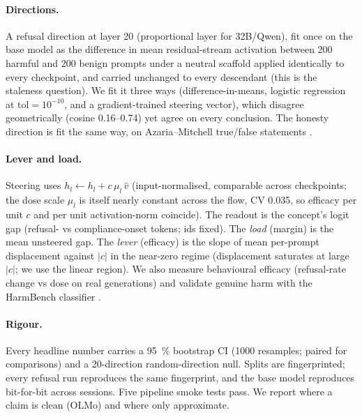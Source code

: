 \documentclass[11pt]{article}
\begin{document}
\paragraph{Directions.} A refusal direction at layer 20 (proportional layer for 32B/Qwen), fit once
on the base model as the difference in mean residual-stream activation between 200 harmful
\citep{advbench} and 200 benign \citep{alpaca} prompts under a neutral scaffold applied identically
to every checkpoint, and carried unchanged to every descendant (this is the staleness question). We
fit it three ways (difference-in-means, logistic regression at $\text{tol}=10^{-10}$, and a
gradient-trained steering vector), which disagree geometrically (cosine \num{0.16}--\num{0.74}) yet
agree on every conclusion. The honesty direction is fit the same way, on Azaria--Mitchell true/false
statements \citep{azariamitchell}.

\paragraph{Lever and load.} Steering uses $h_l \leftarrow h_l + c\,\mu_l\,\hat{v}$ (input-normalised,
comparable across checkpoints; the dose scale $\mu_l$ is itself nearly constant across the flow, CV \num{0.035}, so efficacy per unit $c$ and per unit activation-norm coincide). The readout is the concept's logit gap (refusal- vs
compliance-onset tokens; ids fixed). The \emph{load} (margin) is the mean unsteered gap. The
\emph{lever} (efficacy) is the slope of mean per-prompt displacement against $|c|$ in the near-zero
regime (displacement saturates at large $|c|$; we use the linear region). We also measure
behavioural efficacy (refusal-rate change vs dose on real generations) and validate genuine harm
with the HarmBench classifier \citep{harmbench}.

\paragraph{Rigour.} Every headline number carries a \SI{95}{\percent} bootstrap CI (1000 resamples;
paired for comparisons) and a 20-direction random-direction null. Splits are fingerprinted; every
refusal run reproduces the same fingerprint, and the base model reproduces bit-for-bit across
sessions. Five pipeline smoke tests pass. We report where a claim is clean (OLMo) and where only
approximate.
\end{document}
